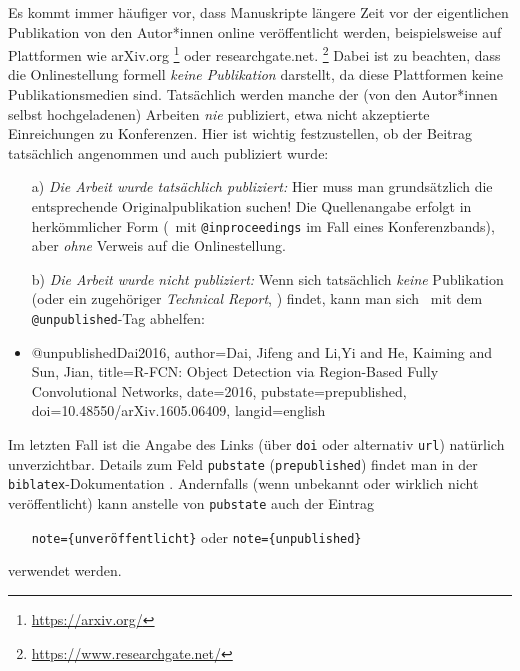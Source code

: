 Es kommt immer häufiger vor, dass Manuskripte längere Zeit vor der
eigentlichen Pub\-likation von den Autor*innen online veröffentlicht werden,
beispielsweise auf Plattformen wie \textsf{arXiv.org}%
\footnote{\url{https://arxiv.org/}}
oder \textsf{researchgate.net}.%
\footnote{\url{https://www.researchgate.net/}}
Dabei ist zu beachten, dass die Onlinestellung formell \emph{keine
Publikation} darstellt, da diese Plattformen keine Publikationsmedien sind.
Tatsächlich werden manche der (von den Autor*innen selbst hochgeladenen)
Arbeiten \emph{nie} publiziert, etwa nicht akzeptierte Einreichungen zu
Konferenzen. Hier ist wichtig festzustellen, ob der Beitrag tatsächlich
angenommen und auch publiziert wurde:
%
\begin{itemize}
\item[a)]
\emph{Die Arbeit wurde tatsächlich publiziert:} Hier muss man grundsätzlich
die entsprechende Original\-publikation suchen! Die Quellenangabe erfolgt in
herkömmlicher Form (\zB\ mit \texttt{@inproceedings} im Fall eines
Konferenzbands), aber \emph{ohne} Verweis auf die Onlinestellung.
\item[b)]
\emph{Die Arbeit wurde \emph{nicht} publiziert:} Wenn sich tatsächlich
\emph{keine} Publikation (oder ein zugehöriger \emph{Technical Report}, \so)
findet, kann man sich \evtl\ mit dem \texttt{@unpublished}-Tag abhelfen:
\item %
\begin{GenericCode}[numbers=none]
@unpublished{Dai2016,
  author={Dai, Jifeng and Li,Yi and He, Kaiming and Sun, Jian},
  title={{R-FCN:} Object Detection via Region-Based Fully Convolutional Networks},
  date={2016},
  pubstate={prepublished},
  doi={10.48550/arXiv.1605.06409},
  langid={english}
}
\end{GenericCode}
\begin{itemize}
\item[\cite{Dai2016}] 
\end{itemize}
\end{itemize}
%
Im letzten Fall ist die Angabe des Links (über \texttt{doi} oder alternativ
\texttt{url}) natürlich unverzichtbar. Details zum Feld \texttt{pubstate}
(\texttt{prepublished}) findet man in der \texttt{biblatex}-Dokumentation
\cite[Abschn.\ 4.9.2.11]{Kime2022}. Andernfalls (wenn unbekannt oder wirklich
nicht veröffentlicht) kann anstelle von \texttt{pubstate} auch der Eintrag
%
\begin{itemize}
\item[]\texttt{note=\{unveröffentlicht\}} \quad oder
   \quad \texttt{note=\{unpublished\}}
\end{itemize}
%
verwendet werden.


